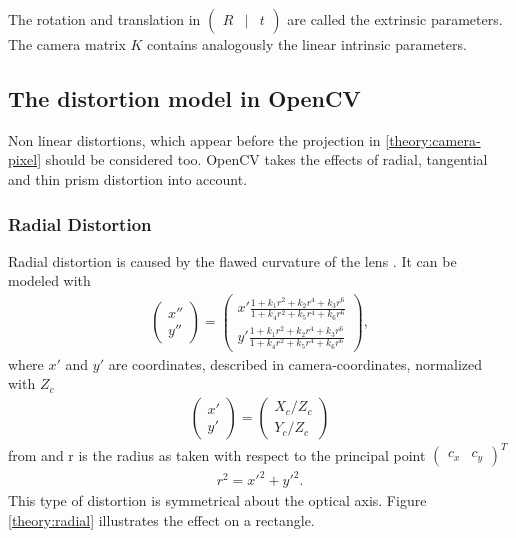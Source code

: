 The rotation and translation in $\begin{pmatrix}R&|&t\end{pmatrix}$ are called the extrinsic parameters. The camera matrix $K$ contains analogously the linear intrinsic parameters.

\subsection{The distortion model in OpenCV\label{theory:distortion}}
Non linear distortions, which appear before the projection in \ref{theory:camera-pixel} should be considered too.
OpenCV takes the effects of radial, tangential and thin prism distortion into account.
\subsubsection{Radial Distortion}
Radial distortion is caused by the flawed curvature of the lens \cite{weng}.
It can be modeled with
\begin{align}
\begin{pmatrix}
x''\\
y''
\end{pmatrix}=
\begin{pmatrix}
x'\frac{1+k_1 r^2+k_2 r^4+k_3 r^6}{1+k_4 r^2+k_5r^4+k_6r^6}\\
y'\frac{1+k_1 r^2+k_2 r^4+k_3 r^6}{1+k_4 r^2+k_5r^4+k_6r^6}
\end{pmatrix}\label{theory:raddist},
\end{align}
where $x'$ and $y'$ are coordinates, described in camera-coordinates, normalized with $Z_c$
\begin{align*}
\begin{pmatrix}
x'\\
y'
\end{pmatrix}=
\begin{pmatrix}
X_c/Z_c\\
Y_c/Z_c
\end{pmatrix}
\end{align*}from
and r is the radius as taken with respect to the principal point $\begin{pmatrix}c_x&c_y\end{pmatrix}^T$
\begin{align*}
r^2 = x'^2 + y'^2.
\end{align*}
This type of distortion is symmetrical about the optical axis.
Figure \ref{theory:radial} illustrates the effect on a rectangle.

